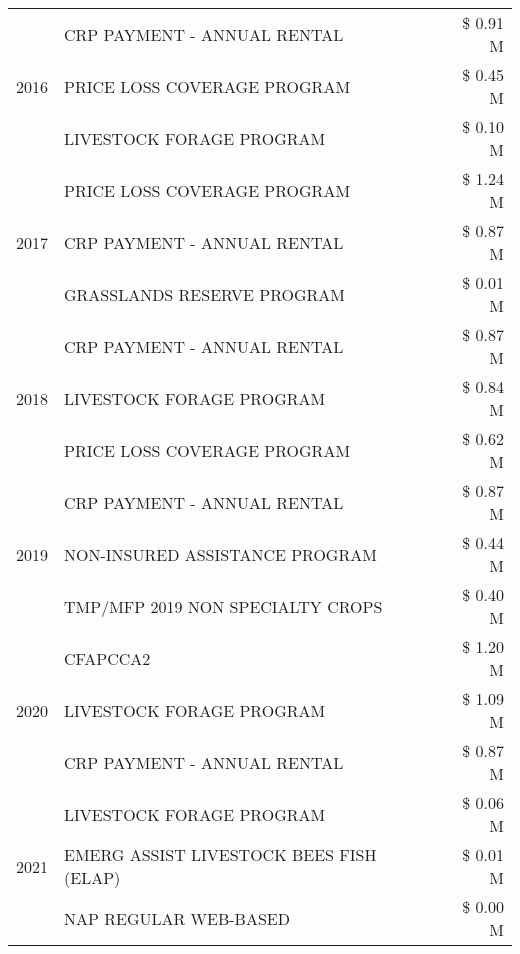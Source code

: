 \begin{tabular}{llr}
\cline{1-3}
\multirow[t]{3}{*}{2016} & CRP PAYMENT - ANNUAL RENTAL & \$ 0.91 M \\
 & PRICE LOSS COVERAGE PROGRAM & \$ 0.45 M \\
 & LIVESTOCK FORAGE PROGRAM & \$ 0.10 M \\
\cline{1-3}
\multirow[t]{3}{*}{2017} & PRICE LOSS COVERAGE PROGRAM & \$ 1.24 M \\
 & CRP PAYMENT - ANNUAL RENTAL & \$ 0.87 M \\
 & GRASSLANDS RESERVE PROGRAM & \$ 0.01 M \\
\cline{1-3}
\multirow[t]{3}{*}{2018} & CRP PAYMENT - ANNUAL RENTAL & \$ 0.87 M \\
 & LIVESTOCK FORAGE PROGRAM & \$ 0.84 M \\
 & PRICE LOSS COVERAGE PROGRAM & \$ 0.62 M \\
\cline{1-3}
\multirow[t]{3}{*}{2019} & CRP PAYMENT - ANNUAL RENTAL & \$ 0.87 M \\
 & NON-INSURED ASSISTANCE PROGRAM & \$ 0.44 M \\
 & TMP/MFP 2019 NON SPECIALTY CROPS & \$ 0.40 M \\
\cline{1-3}
\multirow[t]{3}{*}{2020} & CFAPCCA2 & \$ 1.20 M \\
 & LIVESTOCK FORAGE PROGRAM & \$ 1.09 M \\
 & CRP PAYMENT - ANNUAL RENTAL & \$ 0.87 M \\
\cline{1-3}
\multirow[t]{3}{*}{2021} & LIVESTOCK FORAGE PROGRAM & \$ 0.06 M \\
 & EMERG ASSIST LIVESTOCK BEES FISH (ELAP) & \$ 0.01 M \\
 & NAP REGULAR WEB-BASED & \$ 0.00 M \\
\cline{1-3}
\bottomrule
\end{tabular}

